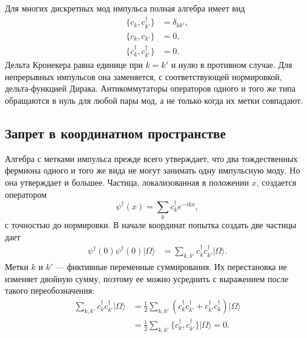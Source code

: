Для многих дискретных мод импульса полная алгебра имеет вид
\begin{align}
\{c_k,c_{k'}^\dagger\}&=\delta_{kk'},
\\
\{c_k,c_{k'}\}&=0,
\\
\{c_k^\dagger,c_{k'}^\dagger\}&=0.
\end{align}
Дельта Кронекера равна единице при \(k=k'\) и нулю в противном случае. Для непрерывных импульсов она заменяется, с соответствующей нормировкой, дельта-функцией Дирака. Антикоммутаторы операторов одного и того же типа обращаются в нуль для любой пары мод, а не только когда их метки совпадают.

\subsection{Запрет в координатном пространстве}

Алгебра с метками импульса прежде всего утверждает, что два тождественных фермиона одного и того же вида не могут занимать одну импульсную моду. Но она утверждает и большее. Частица, локализованная в положении \(x\), создается оператором
\begin{equation}
\psi^\dagger(x)=\sum_k c_k^\dagger e^{-ikx},
\end{equation}
с точностью до нормировки. В начале координат попытка создать две частицы дает
\begin{align}
\psi^\dagger(0)\psi^\dagger(0)|\Omega\rangle
&=\sum_{k,k'}c_k^\dagger c_{k'}^\dagger|\Omega\rangle.
\end{align}
Метки \(k\) и \(k'\) — фиктивные переменные суммирования. Их перестановка не изменяет двойную сумму, поэтому ее можно усреднить с выражением после такого переобозначения:
\begin{align}
\sum_{k,k'}c_k^\dagger c_{k'}^\dagger|\Omega\rangle
&=\frac12\sum_{k,k'}
\left(c_k^\dagger c_{k'}^\dagger
+c_{k'}^\dagger c_k^\dagger\right)|\Omega\rangle
\\
&=\frac12\sum_{k,k'}
\{c_k^\dagger,c_{k'}^\dagger\}|\Omega\rangle
=0.
\end{align}

\begin{classroomqa}
\end{classroomqa}

